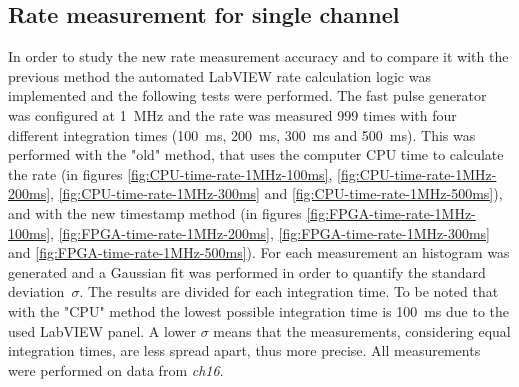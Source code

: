 \subsection{Rate measurement for single channel}\label{RateMeasurements2}
\noindent In order to study the new rate measurement accuracy and to compare it with the previous method the automated LabVIEW rate calculation logic was implemented and the following tests were performed.
The fast pulse generator was configured at 1~MHz and the rate was measured 999 times with four different integration times (100~ms, 200~ms, 300~ms and 500~ms). This was performed with the "old" method, that uses the computer CPU time to calculate the rate (in figures \ref{fig:CPU-time-rate-1MHz-100ms}, \ref{fig:CPU-time-rate-1MHz-200ms}, \ref{fig:CPU-time-rate-1MHz-300ms} and \ref{fig:CPU-time-rate-1MHz-500ms}), and with the new timestamp method (in figures \ref{fig:FPGA-time-rate-1MHz-100ms}, \ref{fig:FPGA-time-rate-1MHz-200ms}, \ref{fig:FPGA-time-rate-1MHz-300ms} and \ref{fig:FPGA-time-rate-1MHz-500ms}). For each measurement an histogram was generated and a Gaussian fit was performed in order to quantify the standard deviation~$\sigma$. 
The results are divided for each integration time.
To be noted that with the "CPU" method the lowest possible integration time is 100~ms due to the used LabVIEW panel.
A lower $\sigma$ means that the measurements, considering equal integration times, are less spread apart, thus more precise.
All measurements were performed on data from \textit{ch16}.

